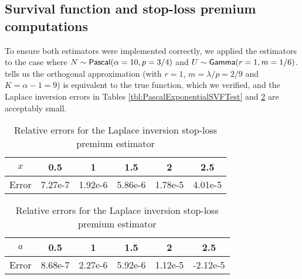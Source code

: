 \newpage
\subsection{Survival function and stop-loss premium computations}

\label{subsec:NumericsSurvivalFunctionStopLoss}

To ensure both estimators were implemented correctly, we applied the estimators to the case where $N\sim\mathsf{Pascal}(\alpha=10,p=3/4)$ and $U\sim\mathsf{Gamma}(r=1,m=1/6)$.  tells us the orthogonal approximation (with $r=1$, $m=\lambda/p=2/9$ and $K = \alpha-1 = 9$) is equivalent to the true function, which we verified, and the Laplace inversion errors in Tables \ref{tbl:PascalExponentialSVFTest} and \ref{tbl:PascalExponentialSLPTest} are acceptably small.

\begin{table}[H]
\centering
\caption{Relative errors for the Laplace inversion survival function estimator} \vspace{1em}
\begin{tabular}{c|ccccc}
$x$                   & 0.5  & 1  & 1.5  & 2 & 2.5  \\
\hline
Error & 7.27e-7 & 1.92e-6 & 5.86e-6 & 1.78e-5 & 4.01e-5 \\
\end{tabular}
\label{tbl:PascalExponentialSVFTest}

\caption{Relative errors for the Laplace inversion stop-loss premium estimator} \vspace{1em}
\begin{tabular}{c|ccccc}
$a$                   & 0.5  & 1  & 1.5  & 2 & 2.5  \\
\hline
Error & 8.68e-7 & 2.27e-6 & 5.92e-6 & 1.12e-5 & -2.12e-5 \\
\end{tabular}

\label{tbl:PascalExponentialSLPTest}
\end{table}


